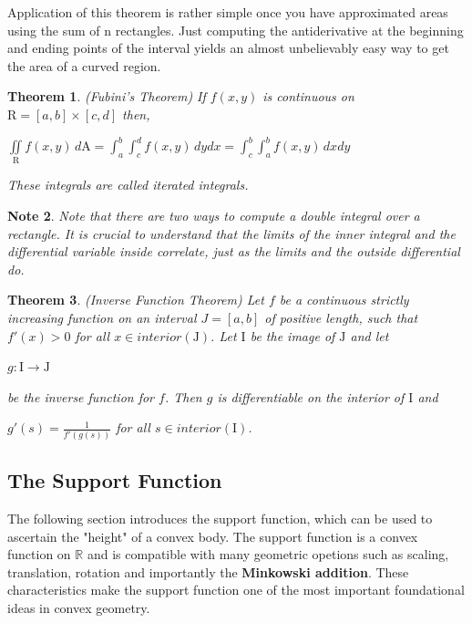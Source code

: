 \documentclass[a4paper]{book}
\newtheorem{theorem}{Theorem}%
\newtheorem{note}[theorem]{Note}%
\numberwithin{theorem}{section}%
\begin{document}
Application of this theorem is rather simple once you have approximated areas using the sum of n rectangles. Just computing the antiderivative at the beginning and ending points of the interval yields an almost unbelievably easy way to get the area of a curved region.

\begin{theorem} (Fubini's Theorem)
    If $f(x,y)$ is continuous on $\displaystyle \mathrm{R}=[a,b]\times[c,d]$ then,
    \begin{center}
        $\displaystyle \underset{\mathrm{R}}{\iint}f(x,y)\,d\mathrm{A}=\int_{a}^{b}\int_{c}^{d}f(x,y)\,dydx=\int_{c}^{b}\int_{a}^{b}f(x,y)\,dxdy$
    \end{center}
    These integrals are called iterated integrals.
\end{theorem}

\begin{note}
    Note that there are two ways to compute a double integral over a rectangle. It is crucial to understand that the limits of the inner integral and the differential variable inside correlate, just as the limits and the outside differential do.
\end{note}

\begin{theorem} (Inverse Function Theorem)
    Let $f$ be a continuous strictly increasing function on an interval $J=[a,b]$ of positive length, such that $f'(x)>0$ for all $x\in interior(\mathrm{J})$. Let $\mathrm{I}$ be the image of $\mathrm{J}$ and let
    \begin{center}
        $\displaystyle g:\mathrm{I}\to\mathrm{J}$
    \end{center}
    be the inverse function for $f$. Then $g$ is differentiable on the interior of $\mathrm{I}$ and
    \begin{center}
        $\displaystyle g'(s)=\frac{1}{f'(g(s))}$ for all $s\in interior(\mathrm{I})$.
    \end{center}
\end{theorem}

\subsection{The Support Function}
The following section introduces the support function, which can be used to ascertain the "height" of a convex body. The support function is a convex function on $\mathbb{R}$ and is compatible with many geometric opetions such as scaling, translation, rotation and importantly the \textbf{Minkowski addition}. These characteristics make the support function one of the most important foundational ideas in convex geometry.~\citep{gehring2019isoperimetric}
\end{document}
